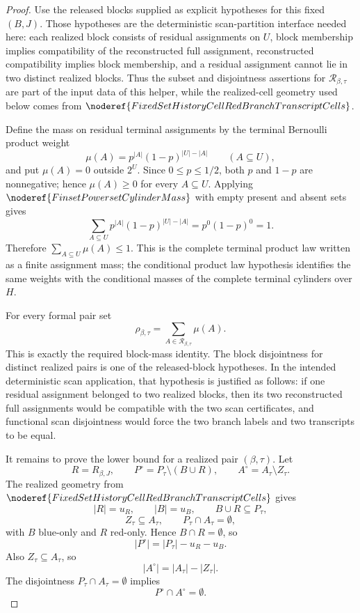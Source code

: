\begin{proof}
Use the released blocks supplied as explicit hypotheses for this fixed
\((B,J)\).  Those hypotheses are the deterministic scan-partition interface
needed here: each realized block consists of residual assignments on \(U\),
block membership implies compatibility of the reconstructed full assignment,
reconstructed compatibility implies block membership, and a residual
assignment cannot lie in two distinct realized blocks.  Thus the subset and
disjointness assertions for \(\mathcal R_{\beta,\tau}\) are part of the
input data of this helper, while the realized-cell geometry used below comes
from \(\noderef{FixedSetHistoryCellRedBranchTranscriptCells}\).

Define the mass on residual terminal assignments by the terminal Bernoulli
product weight
\[
\mu(A)=p^{|A|}(1-p)^{|U|-|A|}
\qquad(A\subseteq U),
\]
and put \(\mu(A)=0\) outside \(2^U\).  Since \(0\le p\le1/2\), both
\(p\) and \(1-p\) are nonnegative; hence \(\mu(A)\ge0\) for every
\(A\subseteq U\).  Applying
\(\noderef{FinsetPowersetCylinderMass}\) with empty present and absent
sets gives
\[
\sum_{A\subseteq U} p^{|A|}(1-p)^{|U|-|A|}
  =p^0(1-p)^0=1.
\]
Therefore \(\sum_{A\subseteq U}\mu(A)\le1\).  This is the complete terminal
product law written as a finite assignment mass; the conditional product law
hypothesis identifies the same weights with the conditional masses of the
complete terminal cylinders over \(H\).

For every formal pair set
\[
\rho_{\beta,\tau}
  =\sum_{A\in\mathcal R_{\beta,\tau}}\mu(A).
\]
This is exactly the required block-mass identity.  The block disjointness for
distinct realized pairs is one of the released-block hypotheses.  In the
intended deterministic scan application, that hypothesis is justified as
follows: if one residual assignment belonged to two realized blocks, then its
two reconstructed full assignments would be compatible with the two scan
certificates, and functional scan disjointness would force the two branch
labels and two transcripts to be equal.

It remains to prove the lower bound for a realized pair
\((\beta,\tau)\).  Let
\[
R=R_{\beta,J},\qquad
P^\circ=P_\tau\setminus(B\cup R),\qquad
A^\circ=A_\tau\setminus Z_\tau .
\]
The realized geometry from
\(\noderef{FixedSetHistoryCellRedBranchTranscriptCells}\) gives
\[
|R|=u_R,\qquad |B|=u_B,\qquad B\cup R\subseteq P_\tau,
\]
\[
Z_\tau\subseteq A_\tau,\qquad P_\tau\cap A_\tau=\emptyset,
\]
with \(B\) blue-only and \(R\) red-only.  Hence \(B\cap R=\emptyset\), so
\[
|P^\circ|=|P_\tau|-u_R-u_B.
\]
Also \(Z_\tau\subseteq A_\tau\), so
\[
|A^\circ|=|A_\tau|-|Z_\tau|.
\]
The disjointness \(P_\tau\cap A_\tau=\emptyset\) implies
\[
P^\circ\cap A^\circ=\emptyset .
\]


\end{proof}
